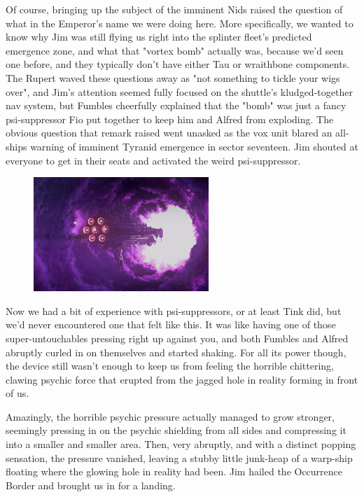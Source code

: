 Of course, bringing up the subject of the imminent Nids raised the question of what in the Emperor's name we were doing here. 
More specifically, we wanted to know why Jim was still flying us right into the splinter fleet's predicted emergence zone, and what that "vortex bomb" actually was, because we'd seen one before, and they typically don't have either Tau or wraithbone components. 
The Rupert waved these questions away as "not something to tickle your wigs over", and Jim's attention seemed fully focused on the shuttle's kludged-together nav system, but Fumbles cheerfully explained that the "bomb" was just a fancy psi-suppressor Fio put together to keep him and Alfred from exploding. 
The obvious question that remark raised went unasked as the vox unit blared an all-ships warning of imminent Tyranid emergence in sector seventeen. 
Jim shouted at everyone to get in their seats and activated the weird psi-suppressor.

\begin{figure}
	\begin{center}
		\includegraphics[width=\figwidth]{pics/21/126.png}
	\end{center}
\end{figure}
Now we had a bit of experience with psi-suppressors, or at least Tink did, but we'd never encountered one that felt like this. 
It was like having one of those super-untouchables pressing right up against you, and both Fumbles and Alfred abruptly curled in on themselves and started shaking. 
For all its power though, the device still wasn't enough to keep us from feeling the horrible chittering, clawing psychic force that erupted from the jagged hole in reality forming in front of us. 


Amazingly, the horrible psychic pressure actually managed to grow stronger, seemingly pressing in on the psychic shielding from all sides and compressing it into a smaller and smaller area. 
Then, very abruptly, and with a distinct popping sensation, the pressure vanished, leaving a stubby little junk-heap of a warp-ship floating where the glowing hole in reality had been. 
Jim hailed the Occurrence Border and brought us in for a landing.

